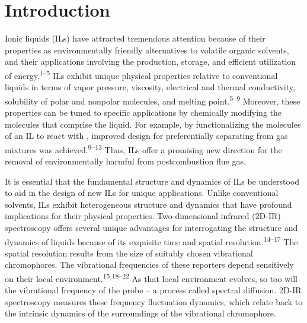 \documentclass[]{article}
\begin{document}
\section{Introduction}
\label{paper_03:sec:I}

Ionic liquids (ILs) have attracted tremendous attention because of their properties as environmentally friendly alternatives to volatile organic solvents, and their applications involving the production, storage, and efficient utilization of energy.\textsuperscript{1--5} ILs exhibit unique physical properties relative to conventional liquids in terms of vapor pressure, viscosity, electrical and thermal conductivity, solubility of polar and nonpolar molecules, and melting point.\textsuperscript{5--9} Moreover, these properties can be tuned to specific applications by chemically modifying the molecules that comprise the liquid. For example, by functionalizing the molecules of an IL to react with , improved design for preferentially separating  from gas mixtures was achieved.\textsuperscript{9--13} Thus, ILs offer a promising new direction for the removal of environmentally harmful  from postcombustion flue gas.

It is essential that the fundamental structure and dynamics of ILs be understood to aid in the design of new ILs for unique applications.  Unlike conventional solvents, ILs exhibit heterogeneous structure and dynamics that have profound implications for their physical properties.  Two-dimensional infrared (2D-IR) spectroscopy offers several unique advantages for interrogating the structure and dynamics of liquids because of its exquisite time and spatial resolution.\textsuperscript{14--17} The spatial resolution results from the size of suitably chosen vibrational chromophores. The vibrational frequencies of these reporters depend sensitively on their local environment.\textsuperscript{15,18--22} As that local environment evolves, so too will the vibrational frequency of the probe -- a process called spectral diffusion. 2D-IR spectroscopy measures these frequency fluctuation dynamics, which relate back to the intrinsic dynamics of the surroundings of the vibrational chromophore.
\end{document}
